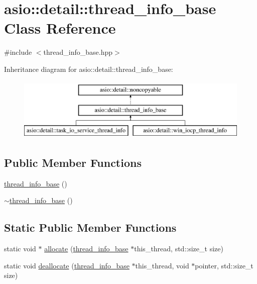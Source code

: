 \hypertarget{classasio_1_1detail_1_1thread__info__base}{}\section{asio\+:\+:detail\+:\+:thread\+\_\+info\+\_\+base Class Reference}
\label{classasio_1_1detail_1_1thread__info__base}


{\ttfamily \#include $<$thread\+\_\+info\+\_\+base.\+hpp$>$}

Inheritance diagram for asio\+:\+:detail\+:\+:thread\+\_\+info\+\_\+base\+:\begin{figure}[H]
\begin{center}
\leavevmode
\includegraphics[height=3.000000cm]{classasio_1_1detail_1_1thread__info__base}
\end{center}
\end{figure}
\subsection*{Public Member Functions}
\begin{DoxyCompactItemize}
\item 
\hyperlink{classasio_1_1detail_1_1thread__info__base_ae90db13f4b48a761a8a76701297e5902}{thread\+\_\+info\+\_\+base} ()
\item 
\hyperlink{classasio_1_1detail_1_1thread__info__base_adec30066279a8b188f26e0b71e3c6a6e}{$\sim$thread\+\_\+info\+\_\+base} ()
\end{DoxyCompactItemize}
\subsection*{Static Public Member Functions}
\begin{DoxyCompactItemize}
\item 
static void $\ast$ \hyperlink{classasio_1_1detail_1_1thread__info__base_ad4357bbddf312d73fae535e716b5dad4}{allocate} (\hyperlink{classasio_1_1detail_1_1thread__info__base}{thread\+\_\+info\+\_\+base} $\ast$this\+\_\+thread, std\+::size\+\_\+t size)
\item 
static void \hyperlink{classasio_1_1detail_1_1thread__info__base_a565e3430cbcb313243df1bcfb4ab8d7b}{deallocate} (\hyperlink{classasio_1_1detail_1_1thread__info__base}{thread\+\_\+info\+\_\+base} $\ast$this\+\_\+thread, void $\ast$pointer, std\+::size\+\_\+t size)
\end{DoxyCompactItemize}


